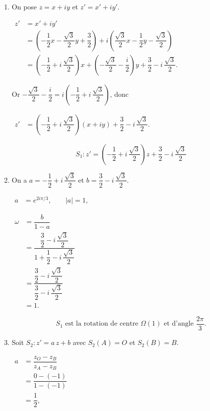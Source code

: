 \documentclass[12pt,a4paper]{article}
\begin{document}
\begin{enumerate}

    \item On pose $z = x + iy$ et $z' = x' + iy'$.

    $
    \begin{aligned}
    z' &= x' + iy' \\[1mm]
       &= \left(-\dfrac12 x - \dfrac{\sqrt3}{2}y + \dfrac32\right) + i\left(\dfrac{\sqrt3}{2}x - \dfrac12 y - \dfrac{\sqrt3}{2}\right) \\[1mm]
       &= \left(-\dfrac12 + i\,\dfrac{\sqrt3}{2}\right)x + \left(-\dfrac{\sqrt3}{2} - \dfrac{i}{2}\right)y + \dfrac32 - i\,\dfrac{\sqrt3}{2}.
    \end{aligned}
    $

    Or $-\dfrac{\sqrt3}{2} - \dfrac{i}{2} = i\left(-\dfrac12 + i\,\dfrac{\sqrt3}{2}\right)$, donc

    $
    \begin{aligned}
    z' &= \left(-\dfrac12 + i\,\dfrac{\sqrt3}{2}\right)(x + iy) + \dfrac32 - i\,\dfrac{\sqrt3}{2}.
    \end{aligned}
    $

    \[
    \boxed{S_1 : z' = \left(-\dfrac12 + i\,\dfrac{\sqrt3}{2}\right)z + \dfrac32 - i\,\dfrac{\sqrt3}{2}}
    \]

    \item On a $a = -\dfrac12 + i\,\dfrac{\sqrt3}{2}$ et $b = \dfrac32 - i\,\dfrac{\sqrt3}{2}$.

    $
    \begin{aligned}
    a &= e^{2i\pi/3}, \qquad |a| = 1,
    \end{aligned}
    $

    $
    \begin{aligned}
    \omega &= \dfrac{b}{1-a} \\[1mm]
           &= \dfrac{\dfrac32 - i\,\dfrac{\sqrt3}{2}}{1 + \dfrac12 - i\,\dfrac{\sqrt3}{2}} \\[1mm]
           &= \dfrac{\dfrac32 - i\,\dfrac{\sqrt3}{2}}{\dfrac32 - i\,\dfrac{\sqrt3}{2}} \\[1mm]
           &= 1.
    \end{aligned}
    $

    \[
    \boxed{S_1 \text{ est la rotation de centre } \Omega(1) \text{ et d'angle } \dfrac{2\pi}{3}.}
    \]

    \item Soit $S_2 : z' = a\,z + b$ avec $S_2(A) = O$ et $S_2(B) = B$.

    $
    \begin{aligned}
    a &= \dfrac{z_O - z_B}{z_A - z_B} \\[1mm]
      &= \dfrac{0 - (-1)}{1 - (-1)} \\[1mm]
      &= \dfrac12,
    \end{aligned}
    $


\end{enumerate}
\end{document}
